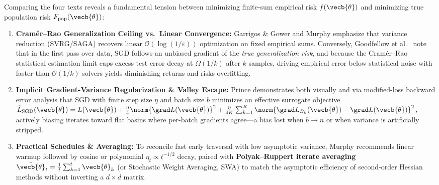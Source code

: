 \documentclass[../../../../master.tex]{subfiles}
\begin{document}
\begin{crossbook}
Comparing the four texts reveals a fundamental tension between minimizing finite-sum empirical risk $f(\vecb{\theta})$ and minimizing true population risk $F_{\mathrm{pop}}(\vecb{\theta})$:
\begin{enumerate}
  \item \textbf{Cram\'er--Rao Generalization Ceiling vs.\ Linear Convergence:} Garrigos \& Gower  and Murphy  emphasize that variance reduction (SVRG/SAGA) recovers linear $\mathcal{O}(\log(1/\varepsilon))$ optimization on fixed empirical sums. Conversely, Goodfellow et al.\  note that in the first pass over data, SGD follows an unbiased gradient of the \emph{true generalization risk}, and because the Cram\'er--Rao statistical estimation limit caps excess test error decay at $\Omega(1/k)$ after $k$ samples, driving empirical error below statistical noise with faster-than-$\mathcal{O}(1/k)$ solvers yields diminishing returns and risks overfitting.
  \item \textbf{Implicit Gradient-Variance Regularization \& Valley Escape:} Prince  demonstrates both visually and via modified-loss backward error analysis that SGD with finite step size $\eta$ and batch size $b$ minimizes an effective surrogate objective $\tilde{L}_{\mathrm{SGD}}(\vecb{\theta}) = L(\vecb{\theta}) + \frac{\eta}{4}\norm{\grad L(\vecb{\theta})}^2 + \frac{\eta}{4K}\sum_{k=1}^K \norm{\grad L_{B_k}(\vecb{\theta}) - \grad L(\vecb{\theta})}^2$, actively biasing iterates toward flat basins where per-batch gradients agree---a bias lost when $b \to n$ or when variance is artificially stripped.
  \item \textbf{Practical Schedules \& Averaging:} To reconcile fast early traversal with low asymptotic variance, Murphy  recommends linear warmup followed by cosine or polynomial $\eta_t \propto t^{-1/2}$ decay, paired with \textbf{Polyak--Ruppert iterate averaging} $\bar{\vecb{\theta}}_t = \frac{1}{t}\sum_{k=1}^t \vecb{\theta}_k$ (or Stochastic Weight Averaging, SWA) to match the asymptotic efficiency of second-order Hessian methods without inverting a $d\times d$ matrix.
\end{enumerate}
\end{crossbook}
\end{document}

